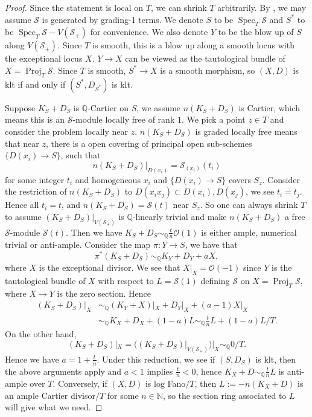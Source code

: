\documentclass[letterpaper,reqno,12pt]{amsart}
\DeclareMathOperator{\Proj}{Proj}
\DeclareMathOperator{\Spec}{Spec}
\numberwithin{equation}{section}
\theoremstyle{plain}
\begin{document}
\begin{proof}
    Since the statement is local on $T$, we can shrink $T$ arbitrarily. By , we may assume $\mathcal S$ is generated by grading-1 terms. We denote $S$ to be $\Spec_T\mathcal S$ and $S^*$ to be $\Spec_T\mathcal S-V(\mathcal S_+)$  for convenience. We also denote $Y$ to be the blow up of $S$ along $V(\mathcal S_+)$. Since $T$ is smooth, this is a blow up along a smooth locus with the exceptional locus $X$. $Y\to X$ can be viewed as the tautological bundle of $X=\Proj_T \mathcal S$. Since $T$ is smooth, $S^*\to X$ is a smooth morphism, so $(X,D)$ is klt if and only if $(S^*,D_{S^*})$ is klt. 

    Suppose $K_S+D_S$ is $\mathbb Q$-Cartier on $S$, we assume $n(K_S+D_S)$ is Cartier, which means this is an $\mathcal S$-module locally free of rank $1$. We pick a point $z\in T$ and consider the problem locally near $z$. $n(K_S+D_S)$ is graded locally free means that near $z$, there is a open covering of principal open sub-schemes $\{D(x_i)\to S\}$, such that \[n(K_S+D_S)|_{D(x_i)}=\mathcal S_{(x_i)}(t_i)\] for some integer $t_i$ and homogeneous $x_i$ and $\{D(x_i)\to S\}$ covers $S_z$. Consider the restriction of $n(K_S+D_S)$ to $D(x_ix_j)\subset D(x_i),D(x_j)$, we see $t_i=t_j$. Hence all $t_i=t$, and $n(K_S+D_S)=\mathcal S(t)$ near $S_z$. So one can always shrink $T$ to assume $(K_S+D_S)|_{V(\mathcal S_+)}$ is $\mathbb Q$-linearly trivial and make $n(K_S+D_S)$ a free $\mathcal S$-module $\mathcal S(t)$. Then we have $K_S+D_S\sim_\mathbb Q\frac{t}{n}\mathcal O(1)$ is either ample, numerical trivial or anti-ample. Consider the map $\pi:Y\to S$, we have that \[\pi^*(K_S+D_S)\sim_\mathbb QK_Y+D_Y+aX,\] where $X$ is the exceptional divisor. We see that $X|_X=\mathcal O(-1)$ since $Y$ is the tautological bundle of $X$ with respect to $L=\mathcal S(1)$ defining $\mathcal S$ on $X=\Proj_T\mathcal S$, where $X\to Y$ is the zero section. Hence \[\begin{aligned}(K_S+D_S)|_X&\sim_\mathbb Q (K_Y+X)|_X+D_Y|_X+(a-1)X|_X\\&\sim_\mathbb Q K_X+D_X+(1-a)L\sim_\mathbb Q\frac{t}{n}L+(1-a)L/T.\end{aligned}\] On the other hand, \[(K_S+D_S)|_X=((K_S+D_S)|_{V(\mathcal S_+)})|_X\sim_\mathbb Q0/T. \] Hence we have $a=1+\frac{t}{n}$. Under this reduction, we see if $(S,D_S)$ is klt, then the above arguments apply and $a<1$ implies $\frac{t}{n}<0$, hence $K_X+D\sim_\mathbb Q\frac{t}{n}L$ is anti-ample over $T$. Conversely, if $(X,D)$ is log Fano$/T$, then $L:=-n(K_X+D)$ is an ample Cartier divisor$/T$ for some $n\in\mathbb N$, so the section ring associated to $L$ will give what we need.
\end{proof}
\end{document}
